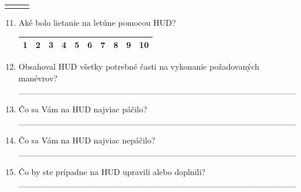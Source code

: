 \begin{enumerate}
\setcounter{enumi}{9}

\end{enumerate}

\newcommand{\printtblhdrrr}{%
  \hfill
  \begingroup
  \setlength\tabcolsep{0pt}%
  \begin{tabularx}{0.41\textwidth}{ @{} l *{3}X r @{} }
    \multicolumn{2}{l}{\bfseries\shortstack[l]{Zložité}}
    &&
    \multicolumn{2}{l}{\bfseries\shortstack[r]{Jednoduché}}
    \\
  \end{tabularx}
  \endgroup
}

\newcommand{\usetblll}{%
  \begin{tabular}{ c c c c c c c c c c}
    \hline
    1 & 2 & 3 & 4 & 5 & 6 & 7 & 8 & 9 & 10\\
    \hline
  \end{tabular}
}

\newcommand\proppp[1]{%
  \item
  \parbox[t]{0.47\textwidth}{#1}%
  \qquad
  \parbox[t]{0.53\textwidth}{\usetblll}%
}

\printtblhdrrr

\begin{enumerate}
\setcounter{enumi}{10}
\proppp{Aké bolo lietanie na letúne pomocou HUD?}

\end{enumerate}

\begin{enumerate}
\setcounter{enumi}{11}
\item{Obsahoval HUD všetky potrebné časti na vykonanie požadovaných manévrov? \newline
\_\_\_\_\_\_\_\_\_\_\_\_\_\_\_\_\_\_\_\_\_\_\_\_\_\_\_\_\_\_\_\_\_\_\_\_\_\_\_\_\_\_\_\_\_}
\item{Čo sa Vám na HUD najviac páčilo? \newline
\_\_\_\_\_\_\_\_\_\_\_\_\_\_\_\_\_\_\_\_\_\_\_\_\_\_\_\_\_\_\_\_\_\_\_\_\_\_\_\_\_\_\_\_\_}
\item{Čo sa Vám na HUD najviac nepáčilo? \newline
\_\_\_\_\_\_\_\_\_\_\_\_\_\_\_\_\_\_\_\_\_\_\_\_\_\_\_\_\_\_\_\_\_\_\_\_\_\_\_\_\_\_\_\_\_}
\item{Čo by ste prípadne na HUD upravili alebo doplnili? \newline
\_\_\_\_\_\_\_\_\_\_\_\_\_\_\_\_\_\_\_\_\_\_\_\_\_\_\_\_\_\_\_\_\_\_\_\_\_\_\_\_\_\_\_\_\_}
\end{enumerate}

